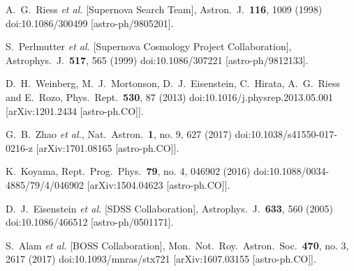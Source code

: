 \documentclass[prd,twocolumn,showpacs,preprintnumbers,amsmath,amssymb,superscriptaddress,nofootinbib,english]{revtex4-1}
\begin{document}
\begin{thebibliography}{99}


  A.~G.~Riess {\it et al.} [Supernova Search Team],
  Astron.\ J.\  {\bf 116}, 1009 (1998)
  doi:10.1086/300499
  [astro-ph/9805201].


  S.~Perlmutter {\it et al.} [Supernova Cosmology Project Collaboration],
  Astrophys.\ J.\  {\bf 517}, 565 (1999)
  doi:10.1086/307221
  [astro-ph/9812133].

  D.~H.~Weinberg, M.~J.~Mortonson, D.~J.~Eisenstein, C.~Hirata, A.~G.~Riess and E.~Rozo,
  Phys.\ Rept.\  {\bf 530}, 87 (2013)
  doi:10.1016/j.physrep.2013.05.001
  [arXiv:1201.2434 [astro-ph.CO]].

  G.~B.~Zhao {\it et al.},
  Nat.\ Astron.\  {\bf 1}, no. 9, 627 (2017)
  doi:10.1038/s41550-017-0216-z
  [arXiv:1701.08165 [astro-ph.CO]].

  K.~Koyama,
  Rept.\ Prog.\ Phys.\  {\bf 79}, no. 4, 046902 (2016)
  doi:10.1088/0034-4885/79/4/046902
  [arXiv:1504.04623 [astro-ph.CO]].

  D.~J.~Eisenstein {\it et al.} [SDSS Collaboration],
  Astrophys.\ J.\  {\bf 633}, 560 (2005)
  doi:10.1086/466512
  [astro-ph/0501171].

  S.~Alam {\it et al.} [BOSS Collaboration],
  Mon.\ Not.\ Roy.\ Astron.\ Soc.\  {\bf 470}, no. 3, 2617 (2017)
  doi:10.1093/mnras/stx721
  [arXiv:1607.03155 [astro-ph.CO]].


\end{thebibliography}
\end{document}

